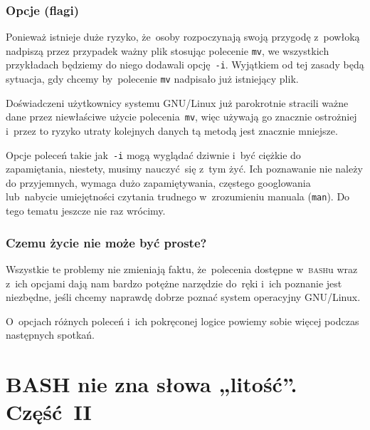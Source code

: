 \documentclass[10pt,t]{beamer}
\begin{document}
\begin{frame}
  \frametitle{Opcje (flagi)}


  Ponieważ istnieje duże ryzyko, że~osoby rozpoczynają swoją przygodę
  z~powłoką nadpiszą przez przypadek ważny plik stosując polecenie
  \texttt{mv}, we wszystkich przykładach będziemy do niego dodawali
  opcję~\texttt{-i}. Wyjątkiem od tej zasady będą sytuacja, gdy chcemy
  by~polecenie \texttt{mv} nadpisało już istniejący plik.

  Doświadczeni użytkownicy systemu GNU/Linux już parokrotnie stracili ważne
  dane przez niewłaściwe użycie polecenia~\texttt{mv}, więc używają go
  znacznie ostrożniej i~przez to ryzyko utraty kolejnych danych tą metodą
  jest znacznie mniejsze.

  Opcje poleceń takie jak~\texttt{-i} mogą wyglądać dziwnie i~być ciężkie
  do zapamiętania, niestety, musimy nauczyć~się z~tym żyć. Ich poznawanie
  nie należy do przyjemnych, wymaga dużo zapamiętywania, częstego
  googlowania lub~nabycie umiejętności czytania trudnego w~zrozumieniu
  manuala (\texttt{man}). Do tego tematu jeszcze nie raz wrócimy.

\end{frame}





\begin{frame}
  \frametitle{Czemu życie nie może być proste?}


  Wszystkie te problemy nie zmieniają faktu, że~polecenia dostępne
  w~\textsc{bash}u wraz z~ich opcjami dają nam bardzo potężne narzędzie
  do~ręki i~ich poznanie jest niezbędne, jeśli chcemy naprawdę dobrze
  poznać system operacyjny GNU/Linux.

  O~opcjach różnych poleceń i~ich pokręconej logice powiemy sobie więcej
  podczas następnych spotkań.

\end{frame}










\section{BASH nie zna słowa „litość”. Część~II}
\end{document}
